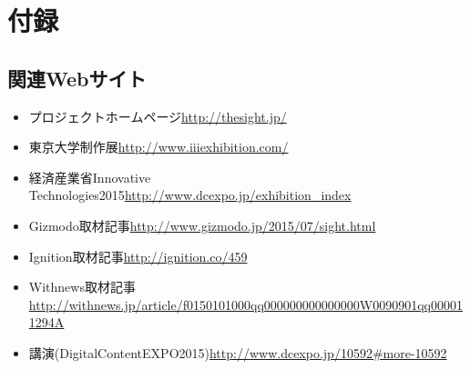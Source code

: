 \section{付録}	

\subsection{関連Webサイト}
\begin{itemize}
\item プロジェクトホームページ\url{http://thesight.jp/}
\item 東京大学制作展\url{http://www.iiiexhibition.com/}
\item 経済産業省Innovative Technologies2015\url{http://www.dcexpo.jp/exhibition_index}
\item Gizmodo取材記事\url{http://www.gizmodo.jp/2015/07/sight.html}
\item Ignition取材記事\url{http://ignition.co/459}
\item Withnews取材記事\url{http://withnews.jp/article/f0150101000qq000000000000000W0090901qq000011294A}
\item 講演(DigitalContentEXPO2015)\url{http://www.dcexpo.jp/10592#more-10592}
\end{itemize}